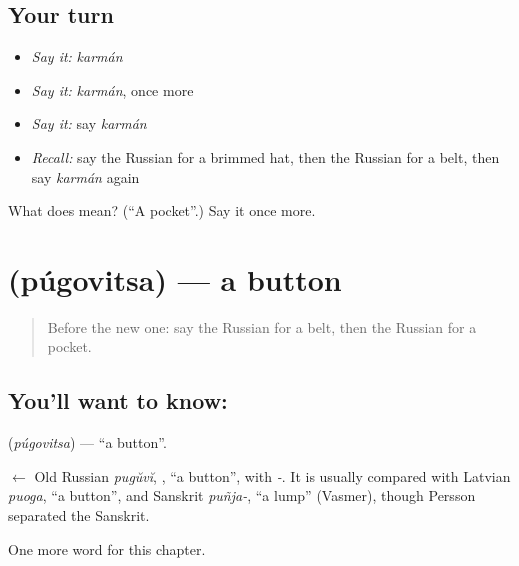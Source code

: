 \subsection*{Your turn}
\begin{itemize}
\raggedright
  \item \emph{Say it:} \emph{karmán}
  \item \emph{Say it:} \emph{karmán}, once more
  \item \emph{Say it:} say \emph{karmán}
  \item \emph{Recall:} say the Russian for a brimmed hat, then the Russian for a belt, then say \emph{karmán} again
\end{itemize}

\begin{tcolorbox}[breakable,colback=teal!4,colframe=teal!35!black,title={Before you move on}]
What does  mean? (\textquotedblleft{}A pocket\textquotedblright{}.) Say it once more.
\end{tcolorbox}
\section[\texorpdfstring{\ru{пуговица} (púgovitsa)}{пуговица (púgovitsa)}]{ (púgovitsa) — a button}

\label{lesson:RU-C193-pugovitsa}



\begin{quote}
Before the new one: say the Russian for a belt, then the Russian for a pocket.
\end{quote}

\subsection*{You'll want to know: }
\textbf{} (\emph{púgovitsa}) — \textquotedblleft{}a button\textquotedblright{}.

\begin{cousinweb}
\textbf{} $\leftarrow$ Old Russian \emph{pugŭvĭ}, \emph{}, \textquotedblleft{}a button\textquotedblright{}, with \emph{-}. It is usually compared with Latvian \emph{puoga}, \textquotedblleft{}a button\textquotedblright{}, and Sanskrit \emph{puñja-}, \textquotedblleft{}a lump\textquotedblright{} (Vasmer), though Persson separated the Sanskrit.
\end{cousinweb}

\begin{grammarlens}[title={What you've built}]
One more word for this chapter.
\end{grammarlens}

